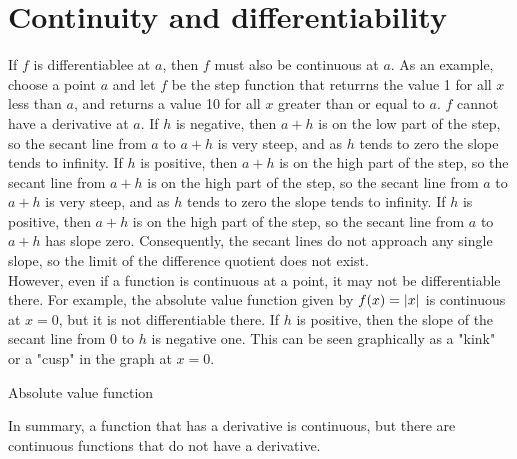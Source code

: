 \section{Continuity and differentiability}
If $f$ is differentiablee at $a$, then $f$ must also be continuous at $a$. As an example, choose a point $a$ and let $f$ be the step function that returrns the value 1 for all $x$ less than $a$, and returns a value 10 for all $x$ greater than or equal to $a$. $f$ cannot have a derivative at $a$. If $h$ is negative, then $a+h$ is on the low part of the step, so the secant line from $a$ to $a+h$ is very steep, and as $h$ tends to zero the slope tends to infinity. If $h$ is positive, then $a+h$ is on the high part of the step, so the secant line from $a+h$ is on the high part of the step, so the secant line from $a$ to $a+h$ is very steep, and as $h$ tends to zero the slope tends to infinity. If $h$ is positive, then $a+h$ is on the high part of the step, so the secant line from $a$ to $a+h$ has slope zero. Consequently, the secant lines do not approach any single slope, so the  limit of the difference quotient does not exist.\\

However, even if a function is continuous at a point, it may not be differentiable there. For example, the absolute value function given by $f(x) = \left\vert x\right\vert$ is continuous at $x=0$, but it is not differentiable there. If $h$ is positive, then the slope of the secant line from $0$ to $h$ is negative one. This can be seen graphically as a "kink" or a "cusp" in the graph at $x=0$.\\

\begin{marginfigure}
    \caption{Absolute value function}
    \label{fig:absolute-value-function}
\end{marginfigure}
In summary, a function that has a derivative is continuous, but there are continuous functions that do not have a derivative.

